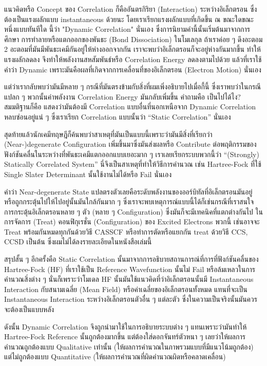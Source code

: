 แนวคิดหรือ Concept ของ Correlation ก็คืออันตรกิริยา (Interaction) ระหว่างอิเล็กตรอน ซึ่งต้องเป็นแรงผลักแบบ instantaneous ด้วยนะ
โดยเราเรียกแรงผลักแบบที่เกิดขึ้น ณ ขณะใดขณะหนึ่งแบบทันทีใด นี้ว่า "Dynamic Correlation" นั่นเอง ซึ่งการนิยามคำนี้นั้นเริ่มต้นมาจากการศึกษา%
การทำลายหรือแตกออกของพันธะ (Bond Dissociation) ในโมเลกุล ถ้าเราค่อย ๆ ดึงอะตอม 2 อะตอมที่มันมีพันธะเคมีกันอยู่ให้ห่างออกจากกัน
เราจะพบว่าอิเล็กตรอนก็จะอยู่ห่างกันมากขึ้น ทำให้แรงผลักลดลง จึงทำให้พลังงานสหสัมพันธ์หรือ Correlation Energy ลดลงตามไปด้วย แล้วที่เราใช้คำว่า
Dynamic เพราะมันคือผลที่เกิดจากการเคลื่อนที่ของอิเล็กตรอน (Electron Motion) นั่นเอง

แต่ว่าเรากลับพบว่ามันมีหลาย ๆ กรณีที่มันตรงข้ามกับสิ่งที่ผมเพิ่งอธิบายไปเมื่อกี้นี้ ซึ่งเราพบว่าในกรณีแปลก ๆ พวกนั้นค่าพลังงาน Correlation Energy
มันกลับเพิ่มขึ้น คำถามคือ เป็นไปได้ไง? สมมติฐานก็คือ แสดงว่ามันต้องมี Correlation แบบอื่นที่นอกเหนือจาก Dynamic Correlation หลบซ่อนอยู่แน่ ๆ
ซึ่งเราเรียก Correlation แบบนั้นว่า \enquote{Static Correlation} นั่นเอง

สุดท้ายแล้วนักเคมีทฤษฎีก็ค้นพบว่าสาเหตุที่มันเป็นแบบนี้เพราะว่ามันมีสิ่งที่เรียกว่า (Near-)degenerate Configuration เพิ่มขึ้นมาซึ่งมันส่งผลหรือ
Contribute ต่อพฤติกรรมของฟังก์ชันคลื่นในระหว่างที่พันธะเคมีแตกออกแบบเยอะมาก ๆ เราเลยเรียกระบบพวกนี้ว่า \enquote{(Strongly) Statically
  Correlated System} นี่จึงเป็นสาเหตุที่ทำให้วิธีการคำนวณ เช่น Hartree-Fock ที่ใช้ Single Slater Determinant นั้นใช้งานไม่ได้หรือ
Fail นั่นเอง

คำว่า Near-degenerate State แปลตรงตัวเลยคือระดับพลังงานของออร์บิทัลที่อิเล็กตรอนมันอยู่หรือถูกกระตุ้นไปให้ไปอยู่นั้นมันใกล้กันมาก ๆ
ซึ่งเราจะพบเหตุการณ์แบบนี้ได้ก็เช่นกรณีที่เราสนใจการกระตุ้นอิเล็กตรอนหลาย ๆ ตัว (หลาย ๆ Configuration) ซึ่งมันก็จะมีเทคนิคที่แตกต่างกันไป%
ในการจัดการ (Treat) คอนฟิกุเรชั่น (Configuration) ของ Excited Electrons พวกนี้ เช่นอาจจะ Treat พร้อมกันหมดทุกกันด้วยวิธี CASSCF
หรือทำการตัดหรือแยกกัน treat ด้วยวิธี CCS, CCSD เป็นต้น ซึ่งผมไม่ได้ลงรายละเอียดในหนังสือเล่มนี้

สรุปสั้น ๆ อีกครั้งคือ Static Correlation นั้นมาจากการอธิบายสถานการณ์ที่การที่ฟังก์ชันคลื่นของ Hartree-Fock (HF) ที่เราใช้เป็น Reference
Wavefunction นั้นไม่ Fail หรือล้มเหลวในการคำนวณสิ่งต่าง ๆ นั่นก็เพราะว่าโมเดล HF นั้นมันใช้แนวคิดที่ว่าอิเล็กตรอนนั้นมี Instantaneous
Interaction กับสนามเฉลี่ย (Mean Field) หรือค่าเฉลี่ยของอิเล็กตรอนทั้งหมด แทนที่จะเป็น Instantaneous Interaction
ระหว่างอิเล็กตรอนตัวอื่น ๆ แต่ละตัว ซึ่งในความเป็นจริงนั้นมันควรจะต้องเป็นแบบหลัง

ดังนั้น Dynamic Correlation จึงถูกนำมาใช้ในการอธิบายระบบต่าง ๆ แทนเพราะว่ามันทำให้ Hartree-Fock Reference นั้นถูกต้องมากขึ้น
แต่ต้องใส่ดอกจันทร์ตัวหนา ๆ เลยว่าให้ผลการคำนวณถูกต้องแบบ Qualitative เท่านั้น (ให้ผลการคำนวณในภาพรวมแบบที่มีแนวโน้มถูกต้อง)
แต่ไม่ถูกต้องแบบ Quantitative (ให้ผลการคำนวณที่ผิดคำนวณผิดหรือคลาดเคลื่อน)

